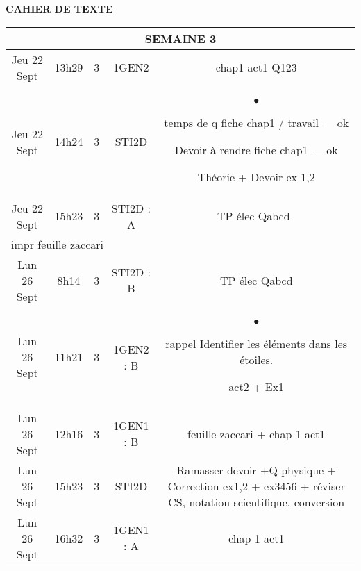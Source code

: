 \documentclass[10pt]{article}
\newcommand{\mypage}[1]{ 
		\begin{minipage}[c]{0.45\textwidth}
			\vspace{5pt}
			{#1}
			\vspace{5pt}
		\end{minipage}
}
\newcommand{\seancea}{	\mypage{chap1 act1 Q123}}
\newcommand{\seanceb}{	\mypage{\begin{list}{$\bullet$}{}
	\item temps de q fiche chap1 / travail --- ok
	\item Devoir à rendre fiche chap1 --- ok
	\item Théorie + Devoir ex 1,2
\end{list}}}
\newcommand{\seancec}{	\mypage{TP élec Qabcd~}}
\newcommand{\seanced}{	\mypage{TP élec Qabcd}}
\newcommand{\seancee}{	\mypage{\begin{list}{$\bullet$}{}
	\item rappel Identifier les éléments dans les étoiles.
	\item act2 + Ex1
\end{list}}}
\newcommand{\seancef}{	\mypage{feuille zaccari + chap 1 act1}}
\newcommand{\seanceg}{	\mypage{Ramasser devoir +Q physique + Correction ex1,2 + ex3456 + réviser CS, notation scientifique, conversion}}
\newcommand{\seanceh}{	\mypage{chap 1 act1}}
\begin{document}
\begin{center}
	\textbf{CAHIER DE TEXTE}
\end{center}

\setlength{\tabcolsep}{13pt}
\renewcommand{\arraystretch}{2.5}
\begin{longtable}{@{}|c|c|c|c|c|@{}} \toprule
	\midrule\multicolumn{5}{||c||}{SEMAINE 3}      \\\midrule\midrule
	Jeu 22 Sept & 13h29 & 3 & 1GEN2     & \seancea \\\midrule
	Jeu 22 Sept & 14h24 & 3 & STI2D     & \seanceb \\\midrule
	Jeu 22 Sept & 15h23 & 3 & STI2D : A & \seancec \\\midrule\midrule
	\multicolumn{5}{|l|}{impr feuille zaccari}     \\\midrule
	Lun 26 Sept & 8h14  & 3 & STI2D : B & \seanced \\\midrule
	Lun 26 Sept & 11h21 & 3 & 1GEN2 : B & \seancee \\\midrule
	Lun 26 Sept & 12h16 & 3 & 1GEN1 : B & \seancef \\\midrule
	Lun 26 Sept & 15h23 & 3 & STI2D     & \seanceg \\\midrule
	Lun 26 Sept & 16h32 & 3 & 1GEN1 : A & \seanceh \\\midrule


	\bottomrule
\end{longtable}
\end{document}
